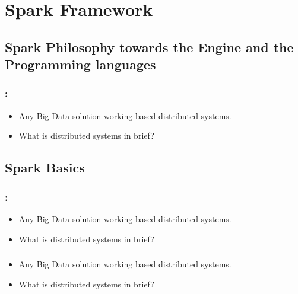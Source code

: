 \section{Spark Framework}

\subsection{Spark Philosophy towards the Engine and the Programming languages}

\begin{frame}
\frametitle{\secname : \subsecname}
\begin{itemize} 
	\item Any Big Data solution working based distributed systems.
	\item What is distributed systems in brief?
\end{itemize}
\end{frame}



\subsection{Spark Basics}


\begin{frame}
  \frametitle{\secname : \subsecname}
	\begin{itemize} 
		\item Any Big Data solution working based distributed systems.
		\item What is distributed systems in brief?
	\end{itemize}
\end{frame}

\begin{frame}
  \frametitle{\subsecname}
	\begin{itemize} 
		\item Any Big Data solution working based distributed systems.
		\item What is distributed systems in brief?
	\end{itemize}
\end{frame}

